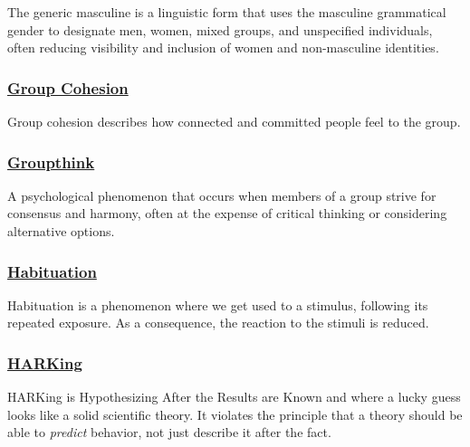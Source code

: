 \documentclass[
  letterpaper,
]{book}
\begin{document}
The generic masculine is a linguistic form that uses the masculine
grammatical gender to designate men, women, mixed groups, and
unspecified individuals, often reducing visibility and inclusion of
women and non-masculine identities.

\subsubsection*{\texorpdfstring{\hyperref[def-groupcohesion]{Group
Cohesion}}{Group Cohesion}}\label{group-cohesion}

Group cohesion describes how connected and committed people feel to the
group.

\subsubsection*{\texorpdfstring{\hyperref[def-groupthink]{Groupthink}}{Groupthink}}\label{groupthink}

A psychological phenomenon that occurs when members of a group strive
for consensus and harmony, often at the expense of critical thinking or
considering alternative options.

\subsubsection*{\texorpdfstring{\hyperref[def-habituation]{Habituation}}{Habituation}}\label{habituation}

Habituation is a phenomenon where we get used to a stimulus, following
its repeated exposure. As a consequence, the reaction to the stimuli is
reduced.

\subsubsection*{\texorpdfstring{\hyperref[def-harking]{HARKing}}{HARKing}}\label{harking}

HARKing is Hypothesizing After the Results are Known and where a lucky
guess looks like a solid scientific theory. It violates the principle
that a theory should be able to \emph{predict} behavior, not just
describe it after the fact.
\end{document}
